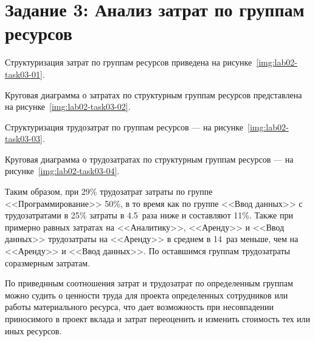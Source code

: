 \section{Задание 3: Анализ затрат по группам ресурсов}

Структуризация затрат по группам ресурсов приведена на
рисунке~\ref{img:lab02-task03-01}.


Круговая диаграмма о затратах по структурным группам ресурсов представлена на
рисунке~\ref{img:lab02-task03-02}.


Структуризация трудозатрат по группам ресурсов --- на
рисунке~\ref{img:lab02-task03-03}.


Круговая диаграмма о трудозатратах по структурным группам ресурсов --- на
рисунке~\ref{img:lab02-task03-04}.


Таким образом, при 29\% трудозатрат затраты по группе <<Программирование>> 50\%,
в то время как по группе <<Ввод данных>> с трудозатратами в
25\% затраты в 4.5~раза ниже и составляют 11\%. Также при примерно равных
затратах на <<Аналитику>>, <<Аренду>> и <<Ввод данных>> трудозатраты на
<<Аренду>> в среднем в 14~раз меньше, чем на <<Аренду>> и <<Ввод данных>>. По
оставшимся группам трудозатраты соразмерным затратам.

По приведнным соотношения затрат и трудозатрат по определенным группам можно
судить о ценности труда для проекта определенных сотрудников или работы
материального ресурса, что дает возможность при несовпадении приносимого в
проект вклада и затрат переоценить и изменить стоимость тех или иных ресурсов.
